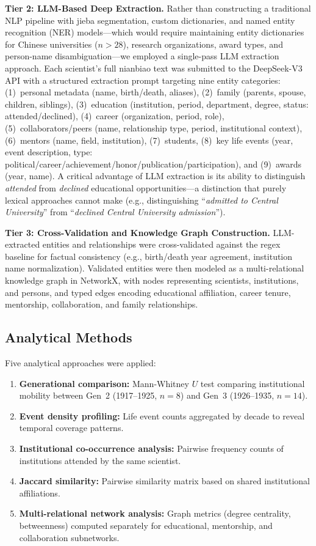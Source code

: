 \documentclass[review]{elsarticle}
\begin{document}
\textbf{Tier 2: LLM-Based Deep Extraction.} Rather than constructing a traditional NLP pipeline with jieba segmentation, custom dictionaries, and named entity recognition (NER) models---which would require maintaining entity dictionaries for Chinese universities ($n>28$), research organizations, award types, and person-name disambiguation---we employed a single-pass LLM extraction approach. Each scientist's full nianbiao text was submitted to the DeepSeek-V3 API with a structured extraction prompt targeting nine entity categories: (1)~personal metadata (name, birth/death, aliases), (2)~family (parents, spouse, children, siblings), (3)~education (institution, period, department, degree, status: attended/declined), (4)~career (organization, period, role), (5)~collaborators/peers (name, relationship type, period, institutional context), (6)~mentors (name, field, institution), (7)~students, (8)~key life events (year, event description, type: political/career/achievement/honor/publication/participation), and (9)~awards (year, name). A critical advantage of LLM extraction is its ability to distinguish \textit{attended} from \textit{declined} educational opportunities---a distinction that purely lexical approaches cannot make (e.g., distinguishing ``\textit{admitted to Central University}'' from ``\textit{declined Central University admission}'').

\textbf{Tier 3: Cross-Validation and Knowledge Graph Construction.} LLM-extracted entities and relationships were cross-validated against the regex baseline for factual consistency (e.g., birth/death year agreement, institution name normalization). Validated entities were then modeled as a multi-relational knowledge graph in NetworkX, with nodes representing scientists, institutions, and persons, and typed edges encoding educational affiliation, career tenure, mentorship, collaboration, and family relationships.

\subsection{Analytical Methods}

Five analytical approaches were applied:
\begin{enumerate}[label=(\arabic*),leftmargin=*]
    \item \textbf{Generational comparison:} Mann-Whitney $U$ test comparing institutional mobility between Gen~2 (1917--1925, $n=8$) and Gen~3 (1926--1935, $n=14$).
    \item \textbf{Event density profiling:} Life event counts aggregated by decade to reveal temporal coverage patterns.
    \item \textbf{Institutional co-occurrence analysis:} Pairwise frequency counts of institutions attended by the same scientist.
    \item \textbf{Jaccard similarity:} Pairwise similarity matrix based on shared institutional affiliations.
    \item \textbf{Multi-relational network analysis:} Graph metrics (degree centrality, betweenness) computed separately for educational, mentorship, and collaboration subnetworks.
\end{enumerate}
\end{document}
